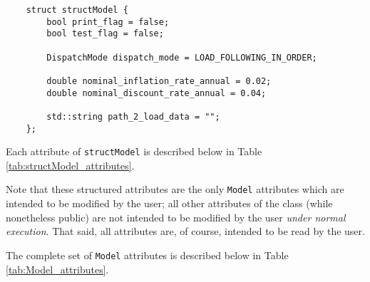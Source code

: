 \documentclass[12pt, letterpaper]{report}
\begin{document}
\begin{verbatim}
    struct structModel {
        bool print_flag = false;
        bool test_flag = false;
        
        DispatchMode dispatch_mode = LOAD_FOLLOWING_IN_ORDER;
        
        double nominal_inflation_rate_annual = 0.02;
        double nominal_discount_rate_annual = 0.04;
        
        std::string path_2_load_data = "";
    };
\end{verbatim}

\newpage
\noindent Each attribute of \texttt{structModel} is described below in Table \ref{tab:structModel_attributes}.

\begin{table}[H]
    \centering
    \caption{\texttt{structModel} attribute descriptions}
    \label{tab:structModel_attributes}
\end{table}

\noindent Note that these structured attributes are the only \texttt{Model} attributes which are intended to be modified by the user; all other attributes of the class (while nonetheless public) are not intended to be modified by the user \textit{under normal execution}. That said, all attributes are, of course, intended to be read by the user.\par 
The complete set of \texttt{Model} attributes is described below in Table \ref{tab:Model_attributes}.
\end{document}
